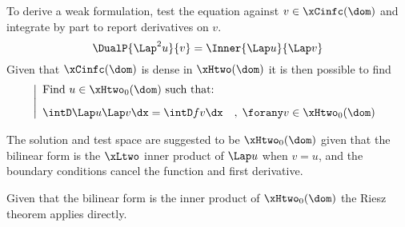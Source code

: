 \begin{tmasltn}{1.3}
\begin{tmatsks}
\item To derive a weak formulation, test the equation against $v \in \xCinfc(\dom)$ and integrate by part to report derivatives on $v$.
\begin{equation*}
\DualP{\Lap^2 u}{v} = \Inner{\Lap u}{\Lap v}
\end{equation*}
Given that $\xCinfc(\dom)$ is dense in $\xHtwo(\dom)$ it is then possible to find 
\begin{equation*}\label{pb:weak_biharmonic}
\left\lvert
\begin{array}{ll}
\mbox{Find $u \in \xHtwo_0(\dom)$ such that:}\\[2ex]
\displaystyle\intD \Lap u \Lap v\dx = \intD f v  \dx\quad,\;\forany  v\in \xHtwo_0(\dom)
\end{array}
\right .
\end{equation*}
\item The solution and test space are suggested to be $\xHtwo_0(\dom)$ given that the bilinear form is the $\xLtwo$ inner product of $\Lap u$ when $v = u$, and the boundary conditions cancel the function and first derivative.
\item Given that the bilinear form is the inner product of $\xHtwo_0(\dom)$ the Riesz theorem applies directly.
\end{tmatsks}
\end{tmasltn}



